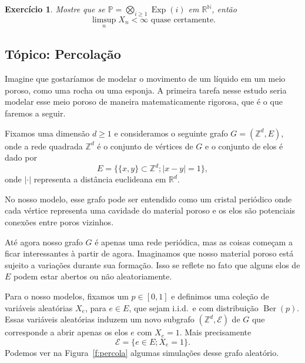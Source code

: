 \documentclass[reqno, draft]{book}
\newcommand*\1{\mathds{1}}
\newtheorem{exercise}[example]{Exercício}
\DeclareMathOperator{\Ber}{Ber}
\DeclareMathOperator{\Exp}{Exp}
\def \iid{i.i.d.~}
\begin{document}
\begin{exercise}
  Mostre que se $\mathbb{P} = \bigotimes_{i \geq 1} \Exp(i)$ em $\mathbb{R}^\mathbb{N}$, então
  \begin{equation}
    \text{$\limsup_n X_n < \infty$ quase certamente.}
  \end{equation}
\end{exercise}

\vfill
\pagebreak

\subsection{Tópico: Percolação}

Imagine que gostaríamos de modelar o movimento de um líquido em um meio poroso, como uma rocha ou uma esponja.
A primeira tarefa nesse estudo seria modelar esse meio poroso de maneira matematicamente rigorosa, que é o que faremos a seguir.

Fixamos uma dimensão $d \geq 1$ e consideramos o seguinte grafo $G = (\mathbb{Z}^d, E)$, onde a rede quadrada $\mathbb{Z}^d$ é o conjunto de vértices de $G$ e o conjunto de elos é dado por
\begin{equation*}
  E = \big\{ \{x, y\} \subset \mathbb{Z}^d; |x - y| = 1 \},
\end{equation*}
onde $|\cdot|$ representa a distância euclideana em $\mathbb{R}^d$.

No nosso modelo, esse grafo pode ser entendido como um cristal periódico onde cada vértice representa uma cavidade do material poroso e os elos são potenciais conexões entre poros vizinhos.

Até agora nosso grafo $G$ é apenas uma rede periódica, mas as coisas começam a ficar interessantes à partir de agora.
Imaginamos que nosso material poroso está sujeito a variações durante sua formação.
Isso se reflete no fato que alguns elos de $E$ podem estar abertos ou não aleatoriamente.

Para o nosso modelos, fixamos um $p \in [0,1]$ e definimos uma coleção de variáveis aleatórias $X_e$, para $e \in E$, que sejam \iid e com distribuição $\Ber(p)$.
Essas variáveis aleatórias induzem um novo subgrafo $(\mathbb{Z}^d, \mathcal{E})$ de $G$ que corresponde a abrir apenas os elos $e$ com $X_e = 1$.
Mais precisamente
\begin{equation}
  \mathcal{E} = \big\{ e \in E; X_e = 1 \big\}.
\end{equation}
Podemos ver na Figura~\ref{f:percola} algumas simulações desse grafo aleatório.
\end{document}
